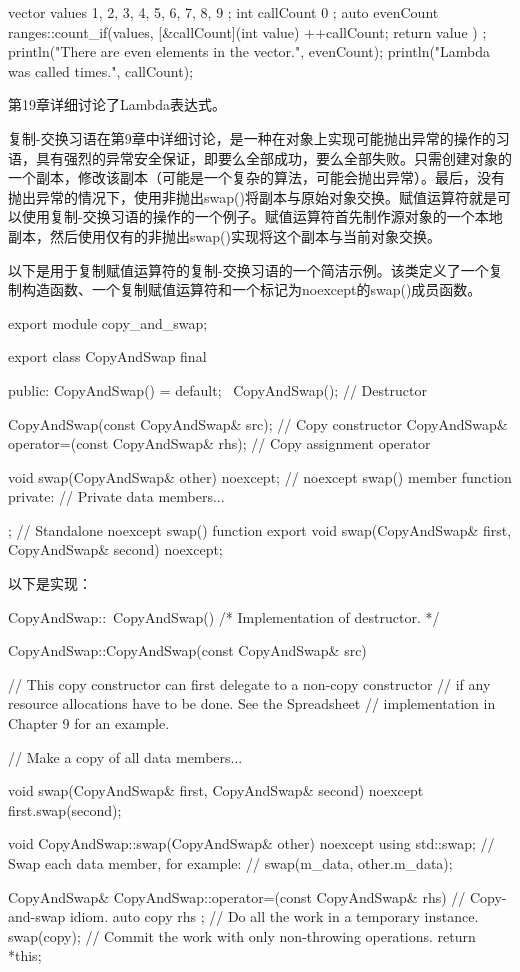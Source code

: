 \begin{cpp}
vector values { 1, 2, 3, 4, 5, 6, 7, 8, 9 };
int callCount { 0 };
auto evenCount { ranges::count_if(values,
    [&callCount](int value) {
        ++callCount;
        return value %
    })
};
println("There are {} even elements in the vector.", evenCount);
println("Lambda was called {} times.", callCount);
\end{cpp}

第19章详细讨论了Lambda表达式。


复制-交换习语在第9章中详细讨论，是一种在对象上实现可能抛出异常的操作的习语，具有强烈的异常安全保证，即要么全部成功，要么全部失败。只需创建对象的一个副本，修改该副本（可能是一个复杂的算法，可能会抛出异常）。最后，没有抛出异常的情况下，使用非抛出swap()将副本与原始对象交换。赋值运算符就是可以使用复制-交换习语的操作的一个例子。赋值运算符首先制作源对象的一个本地副本，然后使用仅有的非抛出swap()实现将这个副本与当前对象交换。

以下是用于复制赋值运算符的复制-交换习语的一个简洁示例。该类定义了一个复制构造函数、一个复制赋值运算符和一个标记为noexcept的swap()成员函数。

\begin{cpp}
export module copy_and_swap;

export class CopyAndSwap final
{
    public:
        CopyAndSwap() = default;
        ~CopyAndSwap(); // Destructor

        CopyAndSwap(const CopyAndSwap& src); // Copy constructor
        CopyAndSwap& operator=(const CopyAndSwap& rhs); // Copy assignment operator

        void swap(CopyAndSwap& other) noexcept; // noexcept swap() member function
    private:
        // Private data members...
};
// Standalone noexcept swap() function
export void swap(CopyAndSwap& first, CopyAndSwap& second) noexcept;
\end{cpp}

以下是实现：

\begin{cpp}
CopyAndSwap::~CopyAndSwap() { /* Implementation of destructor. */ }

CopyAndSwap::CopyAndSwap(const CopyAndSwap& src)
{
    // This copy constructor can first delegate to a non-copy constructor
    // if any resource allocations have to be done. See the Spreadsheet
    // implementation in Chapter 9 for an example.

    // Make a copy of all data members...
}

void swap(CopyAndSwap& first, CopyAndSwap& second) noexcept
{
    first.swap(second);
}

void CopyAndSwap::swap(CopyAndSwap& other) noexcept
{
    using std::swap;
    // Swap each data member, for example:
    // swap(m_data, other.m_data);
}

CopyAndSwap& CopyAndSwap::operator=(const CopyAndSwap& rhs)
{
    // Copy-and-swap idiom.
    auto copy { rhs }; // Do all the work in a temporary instance.
    swap(copy); // Commit the work with only non-throwing operations.
    return *this;
}
\end{cpp}


